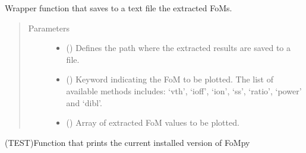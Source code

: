\documentclass[letterpaper,10pt,english,openany, oneside]{sphinxmanual}
\begin{document}
\begin{fulllineitems}
\label{\detokenize{index:fompy.wrappers.savetotxt}}
Wrapper function that saves to a text file the extracted FoMs.
\begin{quote}\begin{description}
\item[{Parameters}] \leavevmode\begin{itemize}
\item {} 
 () \textendash{} Defines the path where the extracted results are saved to a file.

\item {} 
 () \textendash{} Keyword indicating the FoM to be plotted. The list of available methods includes:
‘vth’, ‘ioff’, ‘ion’, ‘ss’, ‘ratio’, ‘power’ and ‘dibl’.

\item {} 
 () \textendash{} Array of extracted FoM values to be plotted.

\end{itemize}

\end{description}\end{quote}

\end{fulllineitems}


\begin{fulllineitems}
\label{\detokenize{index:fompy.wrappers.version}}
(TEST)Function that prints the current installed version of FoMpy

\end{fulllineitems}




\renewcommand{\indexname}{Index}
\printindex
\end{document}
